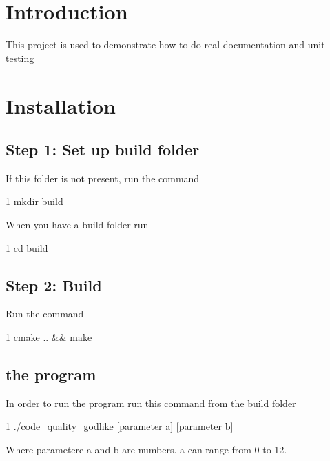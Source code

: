 \hypertarget{index_intro_sec}{}\section{Introduction}\label{index_intro_sec}
This project is used to demonstrate how to do real documentation and unit testing\hypertarget{index_install_sec}{}\section{Installation}\label{index_install_sec}
\hypertarget{index_step1}{}\subsection{Step 1\+: Set up build folder}\label{index_step1}
If this folder is not present, run the command


\begin{DoxyCode}
1 mkdir build
\end{DoxyCode}


When you have a build folder run


\begin{DoxyCode}
1 cd build
\end{DoxyCode}
\hypertarget{index_step2}{}\subsection{Step 2\+: Build}\label{index_step2}
Run the command


\begin{DoxyCode}
1 cmake .. && make
\end{DoxyCode}
\hypertarget{index_Run}{}\subsection{the program}\label{index_Run}
In order to run the program run this command from the build folder


\begin{DoxyCode}
1 ./code\_quality\_godlike [parameter a] [parameter b]
\end{DoxyCode}


Where parametere a and b are numbers. a can range from 0 to 12. 